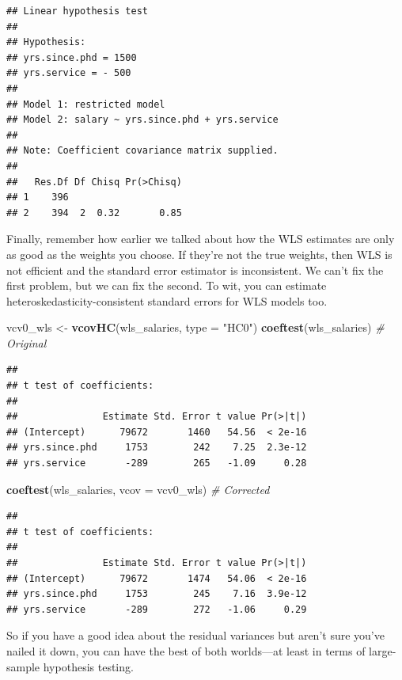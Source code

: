 \documentclass[12pt,oneside,openany]{book}
\newenvironment{Shaded}{\begin{snugshade}}{\end{snugshade}}
\newcommand{\KeywordTok}[1]{\textcolor[rgb]{0.13,0.29,0.53}{\textbf{{#1}}}}
\newcommand{\DataTypeTok}[1]{\textcolor[rgb]{0.13,0.29,0.53}{{#1}}}
\newcommand{\StringTok}[1]{\textcolor[rgb]{0.31,0.60,0.02}{{#1}}}
\newcommand{\CommentTok}[1]{\textcolor[rgb]{0.56,0.35,0.01}{\textit{{#1}}}}
\newcommand{\NormalTok}[1]{{#1}}
\begin{document}
\begin{verbatim}
## Linear hypothesis test
## 
## Hypothesis:
## yrs.since.phd = 1500
## yrs.service = - 500
## 
## Model 1: restricted model
## Model 2: salary ~ yrs.since.phd + yrs.service
## 
## Note: Coefficient covariance matrix supplied.
## 
##   Res.Df Df Chisq Pr(>Chisq)
## 1    396                    
## 2    394  2  0.32       0.85
\end{verbatim}

Finally, remember how earlier we talked about how the WLS estimates are
only as good as the weights you choose. If they're not the true weights,
then WLS is not efficient and the standard error estimator is
inconsistent. We can't fix the first problem, but we can fix the second.
To wit, you can estimate heteroskedasticity-consistent standard errors
for WLS models too.

\begin{Shaded}
\begin{Highlighting}[]
\NormalTok{vcv0_wls <-}\StringTok{ }\KeywordTok{vcovHC}\NormalTok{(wls_salaries, }\DataTypeTok{type =} \StringTok{"HC0"}\NormalTok{)}
\KeywordTok{coeftest}\NormalTok{(wls_salaries)  }\CommentTok{# Original}
\end{Highlighting}
\end{Shaded}

\begin{verbatim}
## 
## t test of coefficients:
## 
##               Estimate Std. Error t value Pr(>|t|)
## (Intercept)      79672       1460   54.56  < 2e-16
## yrs.since.phd     1753        242    7.25  2.3e-12
## yrs.service       -289        265   -1.09     0.28
\end{verbatim}

\begin{Shaded}
\begin{Highlighting}[]
\KeywordTok{coeftest}\NormalTok{(wls_salaries, }\DataTypeTok{vcov =} \NormalTok{vcv0_wls)  }\CommentTok{# Corrected}
\end{Highlighting}
\end{Shaded}

\begin{verbatim}
## 
## t test of coefficients:
## 
##               Estimate Std. Error t value Pr(>|t|)
## (Intercept)      79672       1474   54.06  < 2e-16
## yrs.since.phd     1753        245    7.16  3.9e-12
## yrs.service       -289        272   -1.06     0.29
\end{verbatim}

So if you have a good idea about the residual variances but aren't sure
you've nailed it down, you can have the best of both worlds---at least
in terms of large-sample hypothesis testing.
\end{document}
